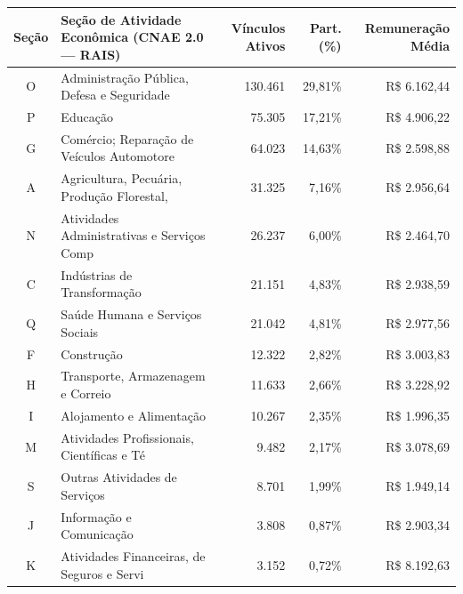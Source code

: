 \documentclass[10pt,a4paper]{article}
\begin{document}
\par\vspace{0.08cm}

\par\vspace{0.08cm}
\noindent\begin{minipage}{\linewidth}
  \par\vspace{2pt}
  {\fontsize{7.0}{8.6}\selectfont\setlength{\tabcolsep}{4.5pt}%
\begin{tabularx}{\linewidth}{c>{\raggedright\arraybackslash}Xrrr}
\toprule
\rowcolor{corprimaria} \textbf{\color{white}Seção} & \textbf{\color{white}Seção de Atividade Econômica (CNAE 2.0 — RAIS)} & \textbf{\color{white}Vínculos Ativos} & \textbf{\color{white}Part. (\%)} & \textbf{\color{white}Remuneração Média} \\
\midrule
O & Administração Pública, Defesa e Seguridade & 130.461 & 29,81\% & R\$ 6.162,44 \\
\rowcolor{corfundo} P & Educação & 75.305 & 17,21\% & R\$ 4.906,22 \\
G & Comércio; Reparação de Veículos Automotore & 64.023 & 14,63\% & R\$ 2.598,88 \\
\rowcolor{corfundo} A & Agricultura, Pecuária, Produção Florestal, & 31.325 & 7,16\% & R\$ 2.956,64 \\
N & Atividades Administrativas e Serviços Comp & 26.237 & 6,00\% & R\$ 2.464,70 \\
\rowcolor{corfundo} C & Indústrias de Transformação & 21.151 & 4,83\% & R\$ 2.938,59 \\
Q & Saúde Humana e Serviços Sociais & 21.042 & 4,81\% & R\$ 2.977,56 \\
\rowcolor{corfundo} F & Construção & 12.322 & 2,82\% & R\$ 3.003,83 \\
H & Transporte, Armazenagem e Correio & 11.633 & 2,66\% & R\$ 3.228,92 \\
\rowcolor{corfundo} I & Alojamento e Alimentação & 10.267 & 2,35\% & R\$ 1.996,35 \\
M & Atividades Profissionais, Científicas e Té & 9.482 & 2,17\% & R\$ 3.078,69 \\
\rowcolor{corfundo} S & Outras Atividades de Serviços & 8.701 & 1,99\% & R\$ 1.949,14 \\
J & Informação e Comunicação & 3.808 & 0,87\% & R\$ 2.903,34 \\
\rowcolor{corfundo} K & Atividades Financeiras, de Seguros e Servi & 3.152 & 0,72\% & R\$ 8.192,63 \\
\bottomrule
\end{tabularx}%
}
  \par{}
\end{minipage}
\par\vspace{0.08cm}
\end{document}
